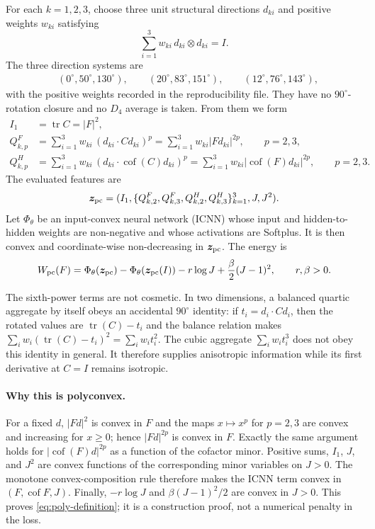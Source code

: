 \documentclass[10pt,a4paper]{article}
\newcommand{\Cof}{\operatorname{cof}}
\newcommand{\tr}{\operatorname{tr}}
\begin{document}
For each $k=1,2,3$, choose three unit structural directions $d_{ki}$ and
positive weights $w_{ki}$ satisfying
\begin{equation}
 \sum_{i=1}^{3}w_{ki}\,d_{ki}\otimes d_{ki}=I.
 \label{eq:balanced-directions}
\end{equation}
The three direction systems are
\begin{align*}
 &(0^\circ,50^\circ,130^\circ),\qquad
 (20^\circ,83^\circ,151^\circ),\qquad
 (12^\circ,76^\circ,143^\circ),
\end{align*}
with the positive weights recorded in the reproducibility file.  They have no
$90^\circ$-rotation closure and no $D_4$ average is taken.  From them we form
\begin{align}
 I_1&=\tr C=|F|^2,\nonumber\\
 Q_{k,p}^F&=\sum_{i=1}^3 w_{ki}\,(d_{ki}\cdot Cd_{ki})^p
       =\sum_{i=1}^3 w_{ki}|Fd_{ki}|^{2p},\qquad p=2,3,\nonumber\\
 Q_{k,p}^H&=\sum_{i=1}^3 w_{ki}\,(d_{ki}\cdot\Cof(C)d_{ki})^p
       =\sum_{i=1}^3 w_{ki}|\Cof(F)d_{ki}|^{2p},\qquad p=2,3.
 \label{eq:qfeatures}
\end{align}
The evaluated features are
\begin{equation}
 \bm z_{\rm pc}=(I_1,\{Q_{k,2}^F,Q_{k,3}^F,Q_{k,2}^H,Q_{k,3}^H\}_{k=1}^3,J,J^2).
\end{equation}
Let $\Phi_\theta$ be an input-convex neural network (ICNN) whose input and
hidden-to-hidden weights are non-negative and whose activations are Softplus.
It is then convex and coordinate-wise non-decreasing in $\bm z_{\rm pc}$.
The energy is
\begin{equation}
 W_{\rm pc}(F)=\Phi_\theta(\bm z_{\rm pc})-
 \Phi_\theta(\bm z_{\rm pc}(I))-r\log J+
 \frac{\beta}{2}(J-1)^2,\qquad r,\beta>0.
 \label{eq:pc-energy}
\end{equation}

The sixth-power terms are not cosmetic.  In two dimensions, a balanced
quartic aggregate by itself obeys an accidental $90^\circ$ identity:
if $t_i=d_i\cdot Cd_i$, then the rotated values are
$\tr(C)-t_i$ and the balance relation makes $\sum_iw_i(\tr(C)-t_i)^2=
\sum_iw_it_i^2$.  The cubic aggregate $\sum_iw_it_i^3$ does not obey this
identity in general.  It therefore supplies anisotropic information while its
first derivative at $C=I$ remains isotropic.

\paragraph{Why this is polyconvex.}
For a fixed $d$, $|Fd|^2$ is convex in $F$ and the maps $x\mapsto x^p$ for
$p=2,3$ are convex and increasing for $x\geq0$; hence $|Fd|^{2p}$ is convex
in $F$.  Exactly the same argument holds for $|\Cof(F)d|^{2p}$ as a function
of the cofactor minor.  Positive sums, $I_1$, $J$, and $J^2$ are convex functions of
the corresponding minor variables on $J>0$.  The monotone convex-composition
rule therefore makes the ICNN term convex in $(F,\Cof F,J)$.  Finally,
$-r\log J$ and $\beta(J-1)^2/2$ are convex in $J>0$.  This proves
\eqref{eq:poly-definition}; it is a construction proof, not a numerical
penalty in the loss.
\end{document}
